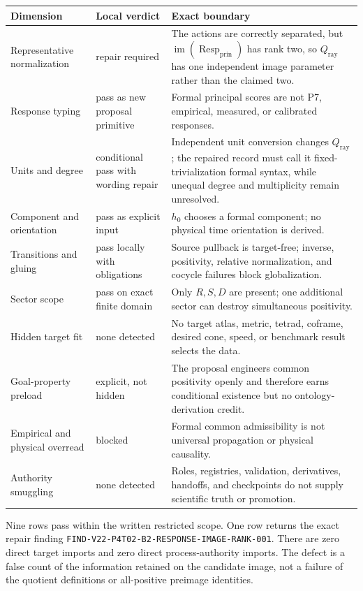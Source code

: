 \documentclass[11pt]{article}
\newcommand{\Resp}{\operatorname{Resp}_{\mathrm{prin}}}
\newcommand{\Qray}{Q_{\mathrm{ray}}}
\begin{document}
\begin{longtable}{>{\raggedright\arraybackslash}p{}>{\raggedright\arraybackslash}p{}>{\raggedright\arraybackslash}p{}}
\toprule
Dimension & Local verdict & Exact boundary \\
\midrule
Representative normalization & repair required & The actions are correctly separated, but $\operatorname{im}(\Resp)$ has rank two, so $\Qray$ has one independent image parameter rather than the claimed two. \\
Response typing & pass as new proposal primitive & Formal principal scores are not P7, empirical, measured, or calibrated responses. \\
Units and degree & conditional pass with wording repair & Independent unit conversion changes $\Qray$; the repaired record must call it fixed-trivialization formal syntax, while unequal degree and multiplicity remain unresolved. \\
Component and orientation & pass as explicit input & $h_0$ chooses a formal component; no physical time orientation is derived. \\
Transitions and gluing & pass locally with obligations & Source pullback is target-free; inverse, positivity, relative normalization, and cocycle failures block globalization. \\
Sector scope & pass on exact finite domain & Only $R,S,D$ are present; one additional sector can destroy simultaneous positivity. \\
Hidden target fit & none detected & No target atlas, metric, tetrad, coframe, desired cone, speed, or benchmark result selects the data. \\
Goal-property preload & explicit, not hidden & The proposal engineers common positivity openly and therefore earns conditional existence but no ontology-derivation credit. \\
Empirical and physical overread & blocked & Formal common admissibility is not universal propagation or physical causality. \\
Authority smuggling & none detected & Roles, registries, validation, derivatives, handoffs, and checkpoints do not supply scientific truth or promotion. \\
\bottomrule
\end{longtable}

Nine rows pass within the written restricted scope.  One row returns the exact
repair finding
\texttt{FIND-V22-P4T02-B2-RESPONSE-IMAGE-RANK-001}.  There are zero direct
target imports and zero direct process-authority imports.  The defect is a
false count of the information retained on the candidate image, not a failure
of the quotient definitions or all-positive preimage identities.
\end{document}
